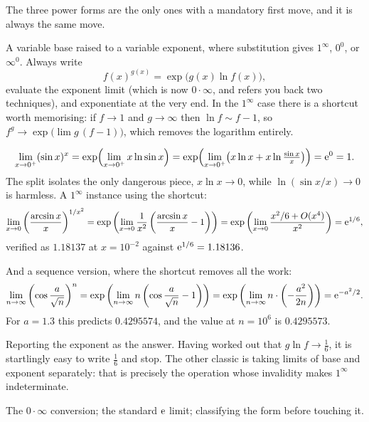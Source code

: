 The three power forms are the only ones with a mandatory first move, and it is always the same move.

\cue A variable base raised to a variable exponent, where substitution gives $1^{\infty}$, $0^{0}$, or $\infty^{0}$.
\method Always write
\[
f(x)^{g(x)}=\exp\bigl(g(x)\ln f(x)\bigr),
\]
evaluate the exponent limit (which is now $0\cdot\infty$, and refers you back two techniques), and exponentiate at the very end. In the $1^{\infty}$ case there is a shortcut worth memorising: if $f\to1$ and $g\to\infty$ then $\ln f\sim f-1$, so $f^{g}\to\exp\bigl(\lim g\,(f-1)\bigr)$, which removes the logarithm entirely.

\begin{worked}
\[
\lim_{x\to0^{+}}(\sin x)^{x}=\exp\Bigl(\lim_{x\to0^{+}}x\ln\sin x\Bigr)=\exp\Bigl(\lim_{x\to0^{+}}\bigl(x\ln x+x\ln\tfrac{\sin x}{x}\bigr)\Bigr)=\mathrm{e}^{0}=1 .
\]
The split isolates the only dangerous piece, $x\ln x\to0$, while $\ln(\sin x/x)\to0$ is harmless. A $1^{\infty}$ instance using the shortcut:
\[
\lim_{x\to0}\left(\frac{\arcsin x}{x}\right)^{1/x^{2}}
=\exp\left(\lim_{x\to0}\frac{1}{x^{2}}\left(\frac{\arcsin x}{x}-1\right)\right)
=\exp\left(\lim_{x\to0}\frac{x^{2}/6+O(x^{4})}{x^{2}}\right)=\mathrm{e}^{1/6},
\]
verified as $1.18137$ at $x=10^{-2}$ against $\mathrm{e}^{1/6}=1.18136$.

And a sequence version, where the shortcut removes all the work:
\[
\lim_{n\to\infty}\left(\cos\frac{a}{\sqrt n}\right)^{n}
=\exp\left(\lim_{n\to\infty}n\left(\cos\frac{a}{\sqrt n}-1\right)\right)
=\exp\left(\lim_{n\to\infty}n\cdot\left(-\frac{a^{2}}{2n}\right)\right)=\mathrm{e}^{-a^{2}/2}.
\]
For $a=1.3$ this predicts $0.4295574$, and the value at $n=10^{6}$ is $0.4295573$.
\end{worked}

\begin{trap}
Reporting the exponent as the answer. Having worked out that $g\ln f\to\tfrac16$, it is startlingly easy to write $\tfrac16$ and stop. The other classic is taking limits of base and exponent separately: that is precisely the operation whose invalidity makes $1^{\infty}$ indeterminate.
\end{trap}

\begin{seealsob}The $0\cdot\infty$ conversion; the standard $\mathrm{e}$ limit; classifying the form before touching it.\end{seealsob}

